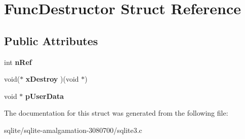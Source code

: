 \hypertarget{struct_func_destructor}{\section{Func\+Destructor Struct Reference}
\label{struct_func_destructor}
}
\subsection*{Public Attributes}
\begin{DoxyCompactItemize}
\item 
\hypertarget{struct_func_destructor_a8b1bf3af00c88400efc1dd74a4410463}{int {\bfseries n\+Ref}}\label{struct_func_destructor_a8b1bf3af00c88400efc1dd74a4410463}

\item 
\hypertarget{struct_func_destructor_a8d688d51ad881306c81b3f8d4795e076}{void($\ast$ {\bfseries x\+Destroy} )(void $\ast$)}\label{struct_func_destructor_a8d688d51ad881306c81b3f8d4795e076}

\item 
\hypertarget{struct_func_destructor_a181875609f0f8221985cd6cfd7ad8cd8}{void $\ast$ {\bfseries p\+User\+Data}}\label{struct_func_destructor_a181875609f0f8221985cd6cfd7ad8cd8}

\end{DoxyCompactItemize}


The documentation for this struct was generated from the following file\+:\begin{DoxyCompactItemize}
\item 
sqlite/sqlite-\/amalgamation-\/3080700/sqlite3.\+c\end{DoxyCompactItemize}
